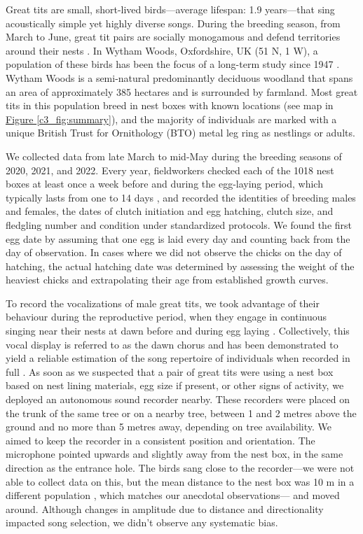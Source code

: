 Great tits are small, short-lived birds---average lifespan: 1.9 years---that sing acoustically simple yet highly diverse songs. During the breeding season, from March to June, great tit pairs are socially monogamous and defend territories around their nests \parencite{hinde1952}. In Wytham Woods, Oxfordshire, UK (51 N, 1 W), a population of these birds has been the focus of a long-term study since 1947 \parencite{lack1964}. Wytham Woods is a semi-natural predominantly deciduous woodland that spans an area of approximately 385 hectares and is surrounded by farmland. Most great tits in this population breed in nest boxes with known locations (see map in \hyperref[c3_fig:summary]{Figure \ref*{c3_fig:summary}}), and the majority of individuals are marked with a unique British Trust for Ornithology (BTO) metal leg ring as nestlings or adults. 

We collected data from late March to mid-May during the breeding seasons of 2020, 2021, and 2022. Every year, fieldworkers checked each of the 1018 nest boxes at least once a week before and during the egg-laying period, which typically lasts from one to 14 days \parencite{Perrins1965}, and recorded the identities of breeding males and females, the dates of clutch initiation and egg hatching, clutch size, and fledgling number and condition under standardized protocols. We found the first egg date by assuming that one egg is laid every day and counting back from the day of observation. In cases where we did not observe the chicks on the day of hatching, the actual hatching date was determined by assessing the weight of the heaviest chicks and extrapolating their age from established growth curves.

To record the vocalizations of male great tits, we took advantage of their behaviour during the reproductive period, when they engage in continuous singing near their nests at dawn before and during egg laying \parencite{mace1987}. Collectively, this vocal display is referred to as the dawn chorus and has been demonstrated to yield a reliable estimation of the song repertoire of individuals when recorded in full \parencite{rivera-gutierrez2012, vanduyse2005}. As soon as we suspected that a pair of great tits were using a nest box based on nest lining materials, egg size if present, or other signs of activity, we deployed an autonomous sound recorder nearby. These recorders were placed on the trunk of the same tree or on a nearby tree, between 1 and 2 metres above the ground and no more than 5 metres away, depending on tree availability. We aimed to keep the recorder in a consistent position and orientation. The microphone pointed upwards and slightly away from the nest box, in the same direction as the entrance hole. The birds sang close to the recorder---we were not able to collect data on this, but the mean distance to the nest box was 10 m in a different population \parencite{halfwerk2012}, which matches our anecdotal observations--- and moved around. Although changes in amplitude due to distance and directionality impacted song selection, we didn't observe any systematic bias.


